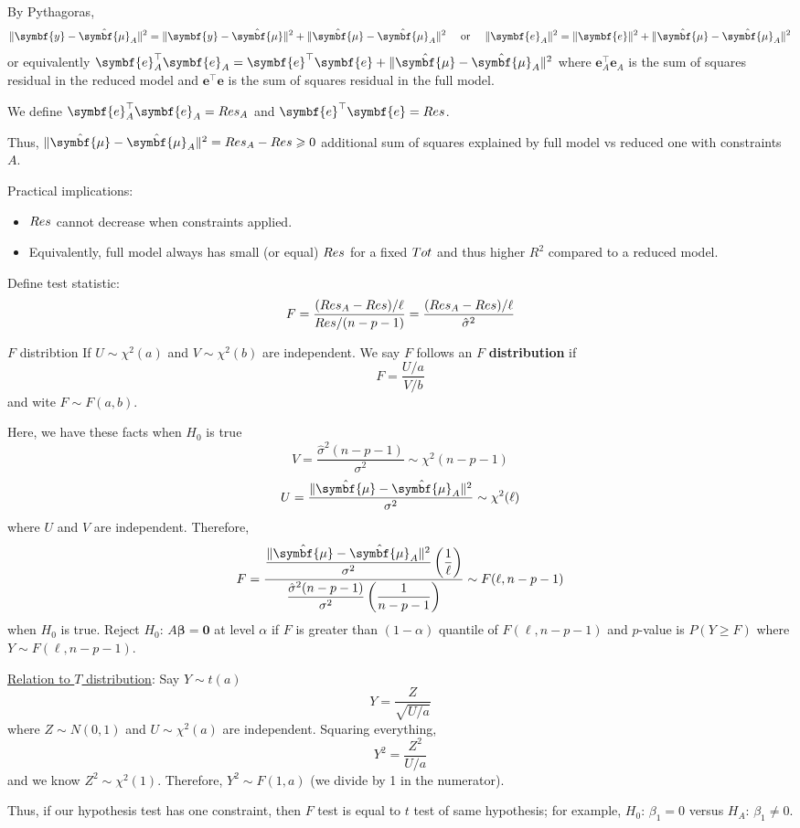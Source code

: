 By Pythagoras,
\[ \norm{\symbf{y}-\hat{\symbf{\mu}}_A}^2=
    \norm{\symbf{y}-\hat{\symbf{\mu}}}^2+
    \norm{\hat{\symbf{\mu}}-\hat{\symbf{\mu}}_A}^2
    \quad\text{ or }\quad
    \norm{\symbf{e}_A}^2=\norm{\symbf{e}}^2+\norm{\hat{\symbf{\mu}}-
        \hat{\symbf{\mu}}_A
    }^2 \]
or equivalently $ \symbf{e}_A^\top \symbf{e}_A=\symbf{e}^\top \symbf{e}
    +\norm{\hat{\symbf{\mu}}-
        \hat{\symbf{\mu}}_A
    }^2 $
where $ \symbf{e}_A^\top \symbf{e}_A $ is the sum of squares
residual in the reduced model and $ \symbf{e}^\top \symbf{e} $
is the sum of squares residual in the full model.

We define $ \symbf{e}_A^\top \symbf{e}_A=\SS{Res}_A $
and $ \symbf{e}^\top \symbf{e} =\SS{Res} $.

Thus, $ \norm{\hat{\symbf{\mu}}-\hat{\symbf{\mu}}_A}^2=
    \SS{Res}_A-\SS{Res} \geqslant 0 $
additional sum of squares explained by full model vs reduced
one with constraints $ A $.

Practical implications:
\begin{itemize}
    \item $ \relax{Res} $ cannot decrease when constraints applied.
    \item Equivalently, full model always has small (or equal)
          $ \relax{Res} $ for a fixed $ \relax{Tot} $
          and thus higher $ R^2 $ compared to a reduced model.
\end{itemize}

Define test statistic:
\[ F=\frac{(\relax{Res}_A-\relax{Res})/\ell}{\relax{Res}/(n-p-1)}=
    \frac{(\relax{Res}_A-\relax{Res})/\ell}{\hat{\sigma}^2}  \]
\begin{Definition}{$F$ distribtion}{}
    If $ U \sim \chi^2(a) $ and $ V \sim \chi^2(b) $
    are independent. We say $ F $ follows an
    $ F $ \textbf{distribution} if
    \[ F=\frac{U/a}{V/b} \]
    and wite $ F \sim F(a,b) $.
\end{Definition}
Here, we have these facts when $ H_0 $ is true
\[ V=\frac{\hat{\sigma}^2(n-p-1)}{\sigma^2}\sim \chi^2(n-p-1)  \]
\[ U=\frac{\norm{\hat{\symbf{\mu}}-\hat{\symbf{\mu}}_A}^2}{\sigma^2}\sim \chi^2(\ell)  \]
where $ U $ and $ V $ are independent. Therefore,
\[ F=\dfrac{\dfrac{\norm{\hat{\symbf{\mu}}-\hat{\symbf{\mu}}_A}^2}{\sigma^2}
        \left( \dfrac{1}{\ell} \right)}{\dfrac{\hat{\sigma}^2(n-p-1)}{\sigma^2}
        \left( \dfrac{1}{n-p-1} \right)} \sim F(\ell,n-p-1)   \]
when $ H_0 $ is true. Reject
$ H_0 $: $ A\symbf{\beta}=\symbf{0} $ at level $ \alpha $
if $ F $ is greater than $ (1-\alpha) $
quantile of $ F(\ell,n-p-1) $
and $ p $-value is $ P(Y\geqslant F) $ where $ Y \sim F(\ell,n-p-1) $.

\underline{Relation to $ T $ distribution}:
Say $ Y \sim t(a) $
\[ Y=\frac{Z}{\sqrt{U/a}}  \]
where $ Z \sim N(0,1) $ and $ U \sim \chi^2(a) $ are independent.
Squaring everything,
\[ Y^2=\frac{Z^2}{U/a} \]
and we know $ Z^2 \sim \chi^2(1) $. Therefore,
$ Y^2 \sim F(1,a) $ (we divide by 1 in the numerator).

Thus, if our hypothesis test has one constraint,
then $ F $ test is equal to $ t $ test of same hypothesis;
for example, $ H_0 $: $ \beta_1=0 $ versus $ H_A $: $ \beta_1\neq 0 $.
